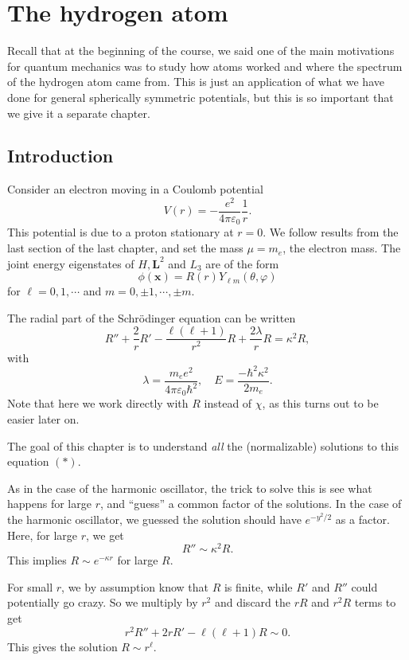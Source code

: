 \documentclass[a4paper]{article}
\begin{document}
\section{The hydrogen atom}
Recall that at the beginning of the course, we said one of the main motivations for quantum mechanics was to study how atoms worked and where the spectrum of the hydrogen atom came from. This is just an application of what we have done for general spherically symmetric potentials, but this is so important that we give it a separate chapter.

\subsection{Introduction}
Consider an electron moving in a Coulomb potential
\[
  V(r) = -\frac{e^2}{4\pi \varepsilon_0} \frac{1}{r}.
\]
This potential is due to a proton stationary at $r = 0$. We follow results from the last section of the last chapter, and set the mass $\mu = m_e$, the electron mass. The joint energy eigenstates of $H, \mathbf{L}^2$ and $L_3$ are of the form
\[
  \phi(\mathbf{x}) = R(r) Y_{\ell m} (\theta, \varphi)
\]
for $\ell = 0, 1, \cdots$ and $m = 0, \pm 1, \cdots, \pm m$.

The radial part of the Schr\"odinger equation can be written
\[
  R'' + \frac{2}{r} R' - \frac{\ell(\ell + 1)}{r^2}R + \frac{2 \lambda}{r} R = \kappa^2 R,\tag{$*$}
\]
with
\[
  \lambda = \frac{m_e e^2}{4\pi \varepsilon_0 \hbar^2},\quad E = \frac{-\hbar^2 \kappa^2}{2 m_e}.
\]
Note that here we work directly with $R$ instead of $\chi$, as this turns out to be easier later on.

The goal of this chapter is to understand \emph{all} the (normalizable) solutions to this equation $(*)$.

As in the case of the harmonic oscillator, the trick to solve this is see what happens for large $r$, and ``guess'' a common factor of the solutions. In the case of the harmonic oscillator, we guessed the solution should have $e^{-y^2/2}$ as a factor. Here, for large $r$, we get
\[
  R'' \sim \kappa^2 R.
\]
This implies $R \sim e^{-\kappa r}$ for large $R$.

For small $r$, we by assumption know that $R$ is finite, while $R'$ and $R''$ could potentially go crazy. So we multiply by $r^2$ and discard the $rR$ and $r^2R$ terms to get
\[
  r^2 R'' + 2r R' - \ell(\ell + 1) R \sim 0.
\]
This gives the solution $R \sim r^\ell$.
\end{document}
